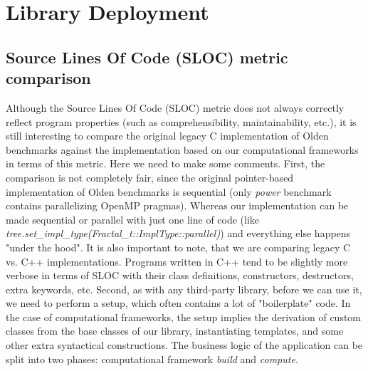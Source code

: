 \section{Library Deployment}
\label{frameworks_performance}
\subsection{Source Lines Of Code (SLOC) metric  comparison}
\label{frameworks_loc}
\quad Although the Source Lines Of Code (SLOC) metric does not always correctly reflect program properties (such as comprehensibility, maintainability, etc.), it is still interesting to compare the original legacy C implementation of Olden benchmarks against the implementation based on our computational frameworks in terms of this metric.\newline\null
\quad Here we need to make some comments. First, the comparison is not completely fair, since the original pointer-based implementation of Olden benchmarks is sequential (only \textit{power} benchmark contains parallelizing OpenMP pragmas). Whereas our implementation can be made sequential or parallel with just one line of code (like \textit{tree.set\_impl\_type(Fractal\_t::ImplType::parallel)}) and everything else happens "under the hood". It is also important to note, that we are comparing legacy C vs. C++ implementations. Programs written in C++ tend to be slightly more verbose in terms of SLOC with their class definitions, constructors, destructors, extra keywords, etc. Second, as with any third-party library, before we can use it, we need to perform a setup, which often contains a lot of "boilerplate" code. In the case of computational frameworks, the setup implies the derivation of custom classes from the base classes of our library, instantiating templates, and some other extra syntactical constructions. The business logic of the application can be split into two phases: computational framework \textit{build} and \textit{compute}.\newline\null

